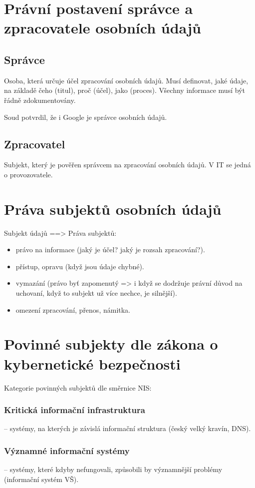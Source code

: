 \clearpage
\section{Právní postavení správce a zpracovatele osobních údajů}
\subsection*{Správce}
Osoba, která určuje účel zpracování osobních údajů. Musí definovat, jaké údaje, na základě čeho (titul), proč (účel), jako (proces). Všechny informace musí být řádně zdokumentovány.

Soud potvrdil, že i Google je správce osobních údajů.

\subsection*{Zpracovatel}
Subjekt, který je  pověřen správcem na zpracování osobních údajů. V IT se jedná o provozovatele.

\clearpage
\section{Práva subjektů osobních údajů}
Subjekt údajů ==> 
Práva subjektů:
\begin{itemize}
        \item právo na informace (jaký je účel? jaký je rozsah zpracování?).
        \item přístup, opravu (když jsou údaje chybné).
        \item vymazání (právo byť zapomenutý => i když se dodržuje právní důvod na uchovaní, když to subjekt už více nechce,  je silnější).
        \item omezení zpracování, přenos, námitka.
\end{itemize}

\clearpage
\section{Povinné subjekty dle zákona o kybernetické bezpečnosti}
Kategorie povinných subjektů dle směrnice NIS:

\subsubsection*{Kritická informační infrastruktura} -- systémy, na kterých je závislá informační struktura (český velký kravín, DNS).
\subsubsection*{Významné informační systémy} -- systémy, které kdyby nefungovali, způsobili by významnější problémy (informační systém VŠ).

